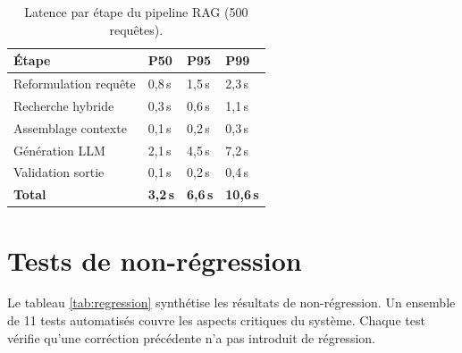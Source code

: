 \documentclass[12pt,a4paper,oneside]{report}
\begin{document}
\begin{table}[htbp]\centering

\begin{tabular}{@{}llll@{}}

\toprule

\textbf{\'{E}tape} & \textbf{P50} & \textbf{P95} & \textbf{P99} \\

\midrule

Reformulation requ\^{e}te & 0,8\,s & 1,5\,s & 2,3\,s \\

Recherche hybride & 0,3\,s & 0,6\,s & 1,1\,s \\

Assemblage contexte & 0,1\,s & 0,2\,s & 0,3\,s \\

G\'{e}n\'{e}ration LLM & 2,1\,s & 4,5\,s & 7,2\,s \\

Validation sortie & 0,1\,s & 0,2\,s & 0,4\,s \\

\midrule

\textbf{Total} & \textbf{3,2\,s} & \textbf{6,6\,s} & \textbf{10,6\,s} \\

\bottomrule

\end{tabular}

\caption{Latence par \'{e}tape du pipeline RAG (500 requ\^{e}tes).}\label{tab:latence}

\end{table}



\section{Tests de non-r\'{e}gression}



Le tableau \ref{tab:regression} synth\'{e}tise les r\'{e}sultats de non-r\'{e}gression. Un ensemble de 11 tests automatis\'{e}s couvre les aspects critiques du syst\`{e}me. Chaque test v\'{e}rifie qu'une corr\'{e}ction pr\'{e}c\'{e}dente n'a pas introduit de r\'{e}gression.
\end{document}
